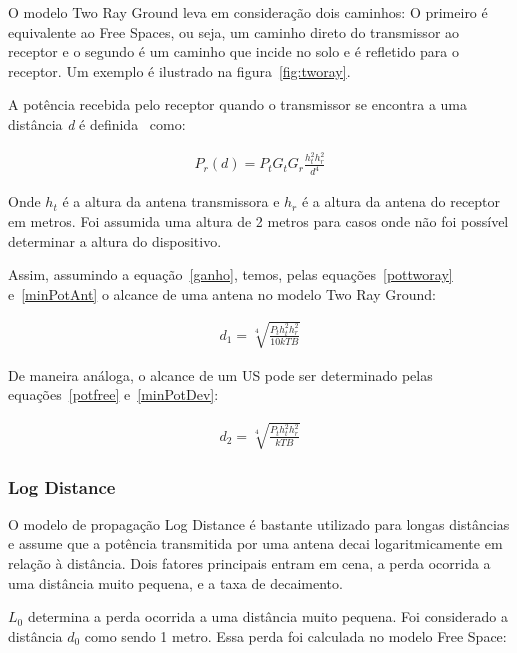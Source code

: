 O modelo Two Ray Ground leva em consideração dois caminhos: O primeiro é equivalente ao Free Spaces, ou seja, um caminho direto do transmissor ao receptor e o segundo é um caminho que incide no solo e é refletido para o receptor. Um exemplo é ilustrado na figura~\ref{fig:tworay}.

A potência recebida pelo receptor quando o transmissor se encontra a uma distância \textit{d} é definida~\cite{rapapport} como: 

\begin{align}
  \label{pottworay} P_r(d) = P_tG_tG_r\frac{h_t^{2}h_r^{2}}{d^4}
\end{align}

Onde \begin{math}h_t\end{math} é a altura da antena transmissora e \begin{math}h_r\end{math} é a altura da antena do receptor em metros. Foi assumida uma altura de 2 metros para casos onde não foi possível determinar a altura do dispositivo.

Assim, assumindo a equação~\ref{ganho}, temos, pelas equações~\ref{pottworay} e~\ref{minPotAnt} o alcance de uma antena no modelo Two Ray Ground:

\begin{align}
  \label{dTwoRayAnt} d_1 = \sqrt[4]{\frac{P_th_t^{2}h_r^{2}}{10kTB}}
\end{align}

De maneira análoga, o alcance de um US pode ser determinado pelas equações~\ref{potfree} e~\ref{minPotDev}:

\begin{align}
  \label{dTwoRayDev} d_2 = \sqrt[4]{\frac{P_th_t^{2}h_r^{2}}{kTB}}
\end{align}


\subsubsection{Log Distance}

O modelo de propagação Log Distance é bastante utilizado para longas distâncias e assume que a potência transmitida por uma antena decai logaritmicamente em relação à distância. Dois fatores principais entram em cena, a perda ocorrida a uma distância muito pequena, e a taxa de decaimento.

\begin{math}L_0\end{math} determina a perda ocorrida a uma distância muito pequena. Foi considerado a distância \begin{math}d_0\end{math} como sendo 1 metro. Essa perda foi calculada no modelo Free Space:

